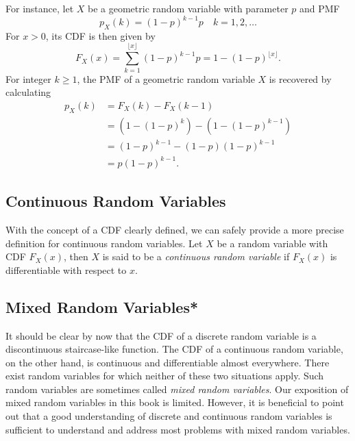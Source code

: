 \begin{example}
For instance, let $X$ be a geometric random variable with parameter $p$ and PMF
\begin{equation*}
p_X (k) = (1 - p)^{k-1} p \quad k = 1, 2, \ldots 
\end{equation*}
For $x > 0$, its CDF is then given by
\begin{equation*}
F_X (x) = \sum_{k = 1}^{\lfloor x \rfloor} (1 - p)^{k-1} p
= 1 - (1 - p)^{\lfloor x \rfloor} .
\end{equation*}
For integer $k \geq 1$, the PMF of a geometric random variable $X$ is recovered by calculating
\begin{equation*}
\begin{split}
p_X (k) &= F_X (k) - F_X (k-1) \\
&= \left( 1 - (1-p)^k \right) - \left( 1 - (1-p)^{k-1} \right) \\
&= (1 - p)^{k-1} - (1-p) (1-p)^{k-1} \\
&= p (1 - p)^{k-1}.
\end{split}
\end{equation*}
\end{example}

\subsection{Continuous Random Variables}

With the concept of a CDF clearly defined, we can safely provide a more precise definition for continuous random variables.
Let $X$ be a random variable with CDF $F_X (x)$, then $X$ is said to be a \emph{continuous random variable} if $F_X (x)$ is differentiable with respect to $x$.

\subsection{Mixed Random Variables*}

It should be clear by now that the CDF of a discrete random variable is a discontinuous staircase-like function.
The CDF of a continuous random variable, on the other hand, is continuous and differentiable almost everywhere.
There exist random variables for which neither of these two situations apply.
Such random variables are sometimes called \emph{mixed random variables}.
Our exposition of mixed random variables in this book is limited.
However, it is beneficial to point out that a good understanding of discrete and continuous random variables is sufficient to understand and address most problems with mixed random variables.


